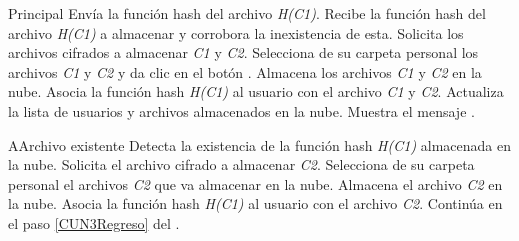 \begin{UCtrayectoria}{Principal}
	\UCpaso [\UCactor] Envía la función hash del archivo \textit{H(C1)}.
	\UCpaso Recibe la función hash del archivo \textit{H(C1)} a almacenar y corrobora la inexistencia de esta. 
	\UCpaso Solicita los archivos cifrados a almacenar \textit{C1} y \textit{C2}.
	\UCpaso [\UCactor] Selecciona de su carpeta personal los archivos \textit{C1} y \textit{C2} y da clic en el botón \IUbuttonAceptar.
	\UCpaso Almacena los archivos \textit{C1} y \textit{C2} en la nube. 
	\UCpaso Asocia la función hash \textit{H(C1)} al usuario con el archivo \textit{C1} y \textit{C2}. 
	\UCpaso Actualiza la lista de usuarios y archivos almacenados en la nube. \label{CUN3Regreso}
	\UCpaso Muestra el mensaje .	
\end{UCtrayectoria}


		
\begin{UCtrayectoriaA}{A}{Archivo existente}
	\UCpaso Detecta la existencia de la función hash \textit{H(C1)} almacenada en la nube. 
	\UCpaso Solicita el archivo cifrado a almacenar \textit{C2}.
	\UCpaso [\UCactor] Selecciona de su carpeta personal el archivos \textit{C2} que va almacenar en la nube.
	\UCpaso Almacena el archivo \textit{C2} en la nube. 
	\UCpaso Asocia la función hash \textit{H(C1)} al usuario con el archivo \textit{C2}. 
	\UCpaso Continúa en el paso \ref{CUN3Regreso} del .
\end{UCtrayectoriaA}

